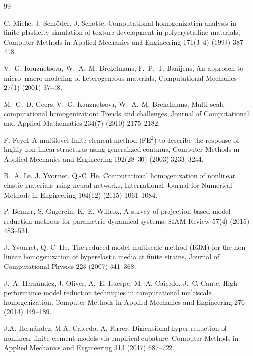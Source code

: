 \begin{thebibliography}{99}

C. Miehe, J. Schr\"oder, J. Schotte, Computational homogenization
analysis in finite plasticity simulation of texture development in
polycrystalline materials, Computer Methods in Applied Mechanics
and Engineering 171(3--4) (1999) 387--418.

V.~G. Kouznetsova, W.~A.~M. Brekelmans, F.~P.~T. Baaijens,
An approach to micro--macro modeling of heterogeneous materials,
Computational Mechanics 27(1) (2001) 37--48.

M.~G.~D. Geers, V.~G. Kouznetsova, W.~A.~M. Brekelmans,
Multi-scale computational homogenization: Trends and challenges,
Journal of Computational and Applied Mathematics 234(7) (2010) 2175--2182.

F. Feyel, A multilevel finite element method (FE$^2$) to describe the
response of highly non-linear structures using generalized continua,
Computer Methods in Applied Mechanics and Engineering 192(28--30) (2003)
3233--3244.

B.~A. Le, J. Yvonnet, Q.-C. He, Computational homogenization of nonlinear
elastic materials using neural networks, International Journal for Numerical
Methods in Engineering 104(12) (2015) 1061--1084.

P. Benner, S. Gugercin, K.~E. Willcox, A survey of projection-based model
reduction methods for parametric dynamical systems, SIAM Review 57(4) (2015)
483--531.

J. Yvonnet, Q.-C. He, The reduced model multiscale method (R3M) for the non-linear homogenization of hyperelastic media at finite strains, Journal of Computational Physics 223 (2007) 341--368. 

J.~A. Hern\'andez, J. Oliver, A.~E. Huespe, M.~A. Caicedo, J.~C.
Cante, High-performance model reduction techniques in computational
multiscale homogenization, Computer Methods in Applied Mechanics
and Engineering 276 (2014) 149--189.

J.A. Hern\'andez, M.A. Caicedo, A. Ferrer, Dimensional hyper-reduction of nonlinear finite element models via empirical cubature, Computer Methods in Applied Mechanics and Engineering 313 (2017) 687--722. 


\end{thebibliography}
